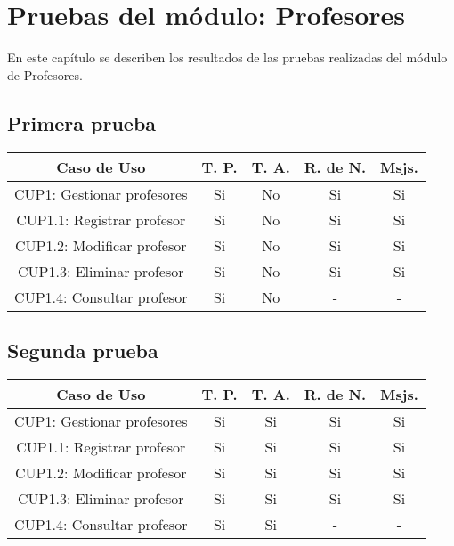 \newpage

\section{Pruebas del módulo: Profesores} \label{chp:pruebasProfesores}
	En este capítulo se describen los resultados de las pruebas realizadas del módulo de Profesores.

\subsection{Primera prueba}
\begin{center}
	\begin{tabular}{ |c|c|c|c|c| } 
		\hline
		Caso de Uso & T. P. & T. A. & R. de N. & Msjs. \\
		\hline 
		CUP1: Gestionar profesores & Si & No & Si & Si \\ 
		CUP1.1: Registrar profesor & Si & No & Si & Si \\ 
		CUP1.2: Modificar profesor & Si & No & Si & Si \\ 
		CUP1.3: Eliminar profesor & Si & No & Si & Si \\ 
		CUP1.4: Consultar profesor & Si & No & - & - \\ 
		\hline
	\end{tabular}
\end{center}

\subsection{Segunda prueba}
\begin{center}
	\begin{tabular}{ |c|c|c|c|c| } 
		\hline
		Caso de Uso & T. P. & T. A. & R. de N. & Msjs. \\
		\hline 
		CUP1: Gestionar profesores & Si & Si & Si & Si \\ 
		CUP1.1: Registrar profesor & Si & Si & Si & Si \\ 
		CUP1.2: Modificar profesor & Si & Si & Si & Si \\ 
		CUP1.3: Eliminar profesor & Si & Si & Si & Si \\ 
		CUP1.4: Consultar profesor & Si & Si & - & - \\ 
		\hline
	\end{tabular}
\end{center}
